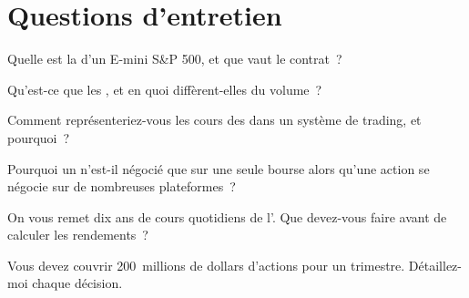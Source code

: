 \section{Questions d'entretien}

\begin{interviewq}\label{iq:m1:futures-contracts-and-exchanges:1}
Quelle est la  d'un  E-mini S\&P 500, et que
vaut le contrat~?
\end{interviewq}

\begin{interviewq}\label{iq:m1:futures-contracts-and-exchanges:2}
Qu'est-ce que les , et en quoi diffèrent-elles du volume~?
\end{interviewq}

\begin{interviewq}\label{iq:m1:futures-contracts-and-exchanges:3}
Comment représenteriez-vous les cours des  dans un système de trading, et pourquoi~?
\end{interviewq}

\begin{interviewq}\label{iq:m1:futures-contracts-and-exchanges:4}
Pourquoi un  n'est-il négocié que sur une seule bourse alors qu'une action se
négocie sur de nombreuses plateformes~?
\end{interviewq}

\begin{interviewq}\label{iq:m1:futures-contracts-and-exchanges:5}
On vous remet dix ans de cours quotidiens de l'. Que devez-vous
faire avant de calculer les rendements~?
\end{interviewq}

\begin{interviewq}\label{iq:m1:futures-contracts-and-exchanges:6}
Vous devez couvrir 200~millions de dollars d'actions pour un trimestre. Détaillez-moi chaque
décision.
\end{interviewq}
